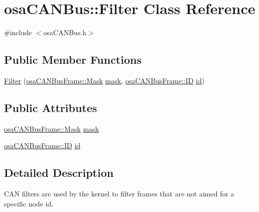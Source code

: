 \hypertarget{classosa_c_a_n_bus_1_1_filter}{\section{osa\-C\-A\-N\-Bus\-:\-:Filter Class Reference}
\label{classosa_c_a_n_bus_1_1_filter}
}


{\ttfamily \#include $<$osa\-C\-A\-N\-Bus.\-h$>$}

\subsection*{Public Member Functions}
\begin{DoxyCompactItemize}
\item 
\hyperlink{classosa_c_a_n_bus_1_1_filter_ae14c86ff803ed277d819e011e23723c6}{Filter} (\hyperlink{classosa_c_a_n_bus_frame_a28c1ee7996aa3559ed24871ab5bd9d0d}{osa\-C\-A\-N\-Bus\-Frame\-::\-Mask} \hyperlink{classosa_c_a_n_bus_1_1_filter_a1218f9d1c03b7eb50cc7cfb993b327ac}{mask}, \hyperlink{classosa_c_a_n_bus_frame_ae917bcfe6427b2055a405716909c6048}{osa\-C\-A\-N\-Bus\-Frame\-::\-I\-D} \hyperlink{classosa_c_a_n_bus_1_1_filter_a20b3abd77672b5fd1fc09dc19ad72f8f}{id})
\end{DoxyCompactItemize}
\subsection*{Public Attributes}
\begin{DoxyCompactItemize}
\item 
\hyperlink{classosa_c_a_n_bus_frame_a28c1ee7996aa3559ed24871ab5bd9d0d}{osa\-C\-A\-N\-Bus\-Frame\-::\-Mask} \hyperlink{classosa_c_a_n_bus_1_1_filter_a1218f9d1c03b7eb50cc7cfb993b327ac}{mask}
\item 
\hyperlink{classosa_c_a_n_bus_frame_ae917bcfe6427b2055a405716909c6048}{osa\-C\-A\-N\-Bus\-Frame\-::\-I\-D} \hyperlink{classosa_c_a_n_bus_1_1_filter_a20b3abd77672b5fd1fc09dc19ad72f8f}{id}
\end{DoxyCompactItemize}


\subsection{Detailed Description}
C\-A\-N filters are used by the kernel to filter frames that are not aimed for a specific node id. 

